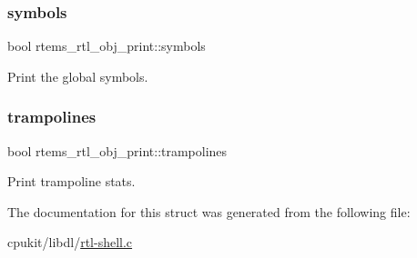 \subsubsection{\texorpdfstring{symbols}{symbols}}
{\footnotesize\ttfamily bool rtems\+\_\+rtl\+\_\+obj\+\_\+print\+::symbols}

Print the global symbols. \mbox{\label{structrtems__rtl__obj__print_ad4855f11240d99950417825ab5cfe1cd}} 
\subsubsection{\texorpdfstring{trampolines}{trampolines}}
{\footnotesize\ttfamily bool rtems\+\_\+rtl\+\_\+obj\+\_\+print\+::trampolines}

Print trampoline stats. 

The documentation for this struct was generated from the following file\+:\begin{DoxyCompactItemize}
\item 
cpukit/libdl/\mbox{\hyperlink{rtl-shell_8c}{rtl-\/shell.\+c}}\end{DoxyCompactItemize}
